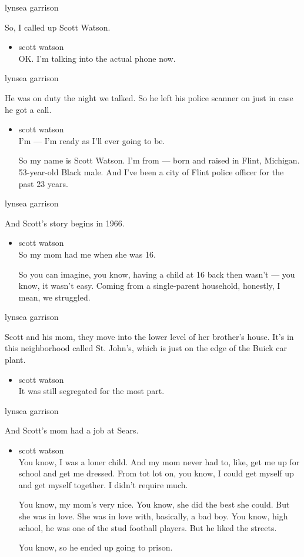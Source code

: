 lynsea garrison

So, I called up Scott Watson.

\begin{itemize}
\tightlist
\item
  scott watson\\
  OK. I'm talking into the actual phone now.
\end{itemize}

lynsea garrison

He was on duty the night we talked. So he left his police scanner on
just in case he got a call.

\begin{itemize}
\item
  scott watson\\
  I'm --- I'm ready as I'll ever going to be.

  So my name is Scott Watson. I'm from --- born and raised in Flint,
  Michigan. 53-year-old Black male. And I've been a city of Flint police
  officer for the past 23 years.
\end{itemize}

lynsea garrison

And Scott's story begins in 1966.

\begin{itemize}
\item
  scott watson\\
  So my mom had me when she was 16.

  So you can imagine, you know, having a child at 16 back then wasn't
  --- you know, it wasn't easy. Coming from a single-parent household,
  honestly, I mean, we struggled.
\end{itemize}

lynsea garrison

Scott and his mom, they move into the lower level of her brother's
house. It's in this neighborhood called St. John's, which is just on the
edge of the Buick car plant.

\begin{itemize}
\tightlist
\item
  scott watson\\
  It was still segregated for the most part.
\end{itemize}

lynsea garrison

And Scott's mom had a job at Sears.

\begin{itemize}
\item
  scott watson\\
  You know, I was a loner child. And my mom never had to, like, get me
  up for school and get me dressed. From tot lot on, you know, I could
  get myself up and get myself together. I didn't require much.

  You know, my mom's very nice. You know, she did the best she could.
  But she was in love. She was in love with, basically, a bad boy. You
  know, high school, he was one of the stud football players. But he
  liked the streets.

  You know, so he ended up going to prison.
\end{itemize}

